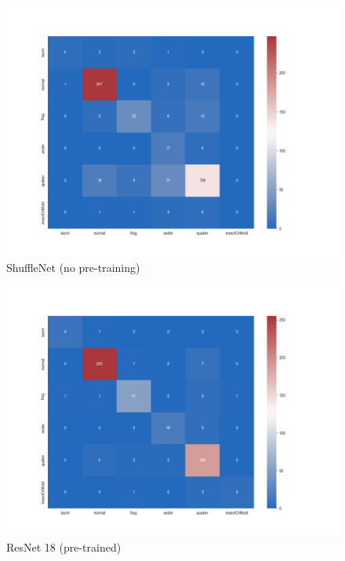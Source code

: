 \begin{figure}
    \centering
    \includegraphics[width=\textwidth]{figures/confusionMatrices/shufflenet-no-pretraining0-5gamma}
    \caption{ShuffleNet (no pre-training)}
    \label{fig:shuffleNet}
\end{figure}

\begin{figure}
    \centering
    \includegraphics[width=\textwidth]{figures/confusionMatrices/resnet_18_93_acc}
    \caption{ResNet 18 (pre-trained)}
    \label{fig:resnet18}
\end{figure}

